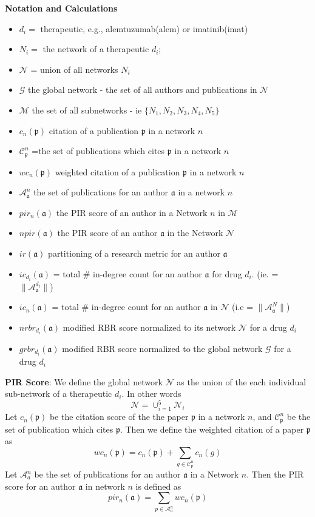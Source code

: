 \documentclass[10pt,letterpaper]{article}
\begin{document}
\textbf{Notation and Calculations}
\begin {itemize}
\item $d_i =$  therapeutic, e.g., alemtuzumab(alem) or imatinib(imat)
\item $N_i =$ the network of a therapeutic $d_i$;
\item $\mathcal{N}$ = union of all networks $N_i$
\item $\mathcal{G}$ the global network - the set of all authors and publications in $\mathcal{N}$ 
\item $\mathcal{M}$ the set of all subnetworks - ie $\{N_1,N_2,N_3,N_4,N_5\}$
\item $c_n(\mathfrak{p})$ citation of a publication $\mathfrak{p}$ in a network $n$
\item $\mathcal{C}_\mathfrak{p}^n$ =the set of publications which cites $\mathfrak{p}$ in a network $n$
\item $wc_n(\mathfrak{p})$  weighted citation of a publication $\mathfrak{p}$ in a network $n$
\item $\mathcal{A}_\mathfrak{a}^n$ the set of publications for an author $\mathfrak{a}$ in a network $n$
\item $pir_n(\mathfrak{a})$ the PIR  score of an author in a Network $n$ in $\mathcal{M}$
\item $npir(\mathfrak{a})$ the PIR score of an author  $\mathfrak{a}$ in the Network  $\mathcal{N}$ 
\item $ir(\mathfrak{a})$ partitioning of a research metric for an author $\mathfrak{a}$ 
\item $ic_{d_i}(\mathfrak{a})$ = total \# in-degree count for an author $\mathfrak{a}$  for drug $d_i$. (ie. = $\|\mathcal{A}_\mathfrak{a}^{d_i}\|$)
\item $ic_n(\mathfrak{a})$ = total \# in-degree count for an author $\mathfrak{a}$  in  $\mathcal{N}$ (i.e = $\|\mathcal{A}_\mathfrak{a}^{N}\|$)
\item $ nrbr_{d_i}(\mathfrak{a}) $ modified RBR score normalized to its network $\mathcal{N}$ for a drug $d_i$
\item $ grbr_{d_i}(\mathfrak{a}) $ modified RBR score normalized to the global network $\mathcal{G}$  for a drug $d_i$
\end{itemize}

\textbf{PIR Score}: We define the global network $\mathcal{N}$ as the union of the each individual sub-network of a therapeutic $d_i$. In other words 
$$ \mathcal{N} = \cup_{i =1}^{5} \mathcal{N}_i $$
Let $c_n(\mathfrak{p})$ be the citation score of the the paper $\mathfrak{p}$ in a network $n$, and $\mathcal{C}_\mathfrak{p}^n$ be the set of publication which cites $\mathfrak{p}$. Then we define the weighted citation of a paper $\mathfrak{p}$ as $$wc_n(\mathfrak{p}) = c_n(\mathfrak{p}) + \sum_{g\in \mathcal{C}_\mathfrak{p}^n}  c_n(g) $$
Let $\mathcal{A}_a^n$ be the set of publications for an author $\mathfrak{a}$ in a Network $n$. Then the PIR score  for an author $\mathfrak{a}$  in network $n$ is defined as $$ pir_n(\mathfrak{a}) =  \sum_{p\in \mathcal{A}_a^n}  wc_n(\mathfrak{p}) $$
\end{document}
